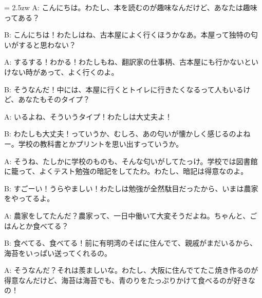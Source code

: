 \documentclass[11pt]{amsart}
\title{}
\author{}
\newenvironment{hangall}[1]{\hangindent = 2.5zw\everypar{\hangindent = 2.5zw}}{}
\begin{document}
\maketitle
\begin{hangall}{}%
A: こんにちは。わたし、本を読むのが趣味なんだけど、あなたは趣味ってある？

B: こんにちは！わたしはね、古本屋によく行くほうかなあ。本屋って独特の匂いがすると思わない？

A: するする！わかる！わたしもね、翻訳家の仕事柄、古本屋にも行かないといけない時があって、よく行くのよ。

B: そうなんだ！中には、本屋に行くとトイレに行きたくなるって人もいるけど、あなたもそのタイプ？

A: いるよね、そういうタイプ！わたしは大丈夫よ！

B: わたしも大丈夫！っていうか、むしろ、あの匂いが懐かしく感じるのよねー。学校の教科書とかプリントを思い出すっていうか。

A: そうね、たしかに学校のものも、そんな匂いがしてたっけ。学校では図書館に籠って、よくテスト勉強の暗記をしてたわ。わたし、暗記は得意なのよ。

B: すごーい！うらやましい！わたしは勉強が全然駄目だったから、いまは農家をやってるよ。

A: 農家をしてたんだ？農家って、一日中働いて大変そうだよね。ちゃんと、ごはんとか食べてる？

B: 食べてる、食べてる！前に有明湾のそばに住んでて、親戚がまだいるから、海苔をいっぱい送ってくれるの。

A: そうなんだ？それは羨ましいな。わたし、大阪に住んでてたこ焼き作るのが得意なんだけど、海苔は海苔でも、青のりをたっぷりかけて食べるのが好きなの！
\end{hangall}
\end{document}
